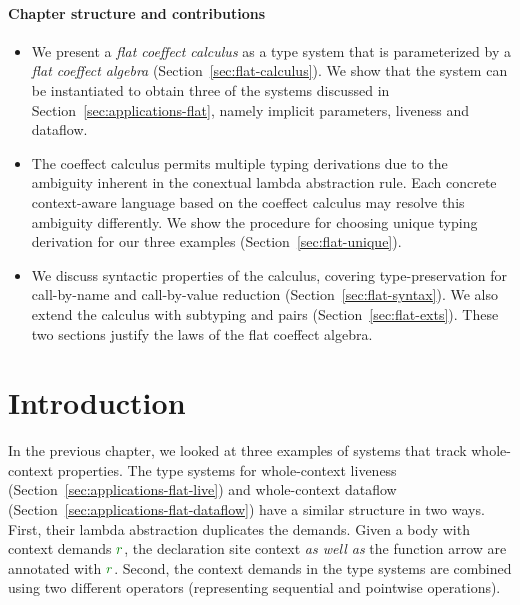 \paragraph{Chapter structure and contributions}
\begin{itemize}
\item We present a \emph{flat coeffect calculus} as a type system that is parameterized by a
  \emph{flat coeffect algebra} (Section~\ref{sec:flat-calculus}). We show that the system can be
  instantiated to obtain three of the systems discussed in Section~\ref{sec:applications-flat},
  namely implicit parameters, liveness and dataflow.

\item The coeffect calculus permits multiple typing derivations due to the ambiguity inherent
  in the conextual lambda abstraction rule. Each concrete context-aware language based on the
  coeffect calculus may resolve this ambiguity differently. We show the procedure for choosing
  unique typing derivation for our three examples (Section~\ref{sec:flat-unique}).

\item We discuss syntactic properties of the calculus, covering type-pre\-ser\-vation for call-by-name
  and call-by-value reduction (Section~\ref{sec:flat-syntax}). We also extend the calculus
  with subtyping and pairs (Section~\ref{sec:flat-exts}). These two sections justify the laws
  of the flat coeffect algebra.
\end{itemize}

%
%

\section{Introduction}
\label{sec:flat-intro}

In the previous chapter, we looked at three examples of systems that track whole-context
properties. The type systems for whole-context liveness (Section~\ref{sec:applications-flat-live})
and whole-context dataflow (Section~\ref{sec:applications-flat-dataflow}) have a similar
structure in two ways. First, their lambda abstraction duplicates the demands. Given a body with
context demands $\cclrd{r}$, the declaration site context \emph{as well as} the function arrow are
annotated with $\cclrd{r}$. Second, the context demands in the type systems are combined using
two different operators (representing sequential and pointwise operations).

